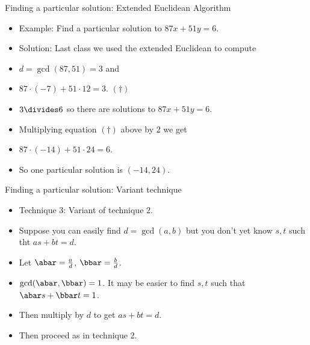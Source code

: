 \documentclass[handout]{beamer}
\begin{document}
\begin{frame}{Finding a particular solution: Extended Euclidean Algorithm}

\begin{itemize}
  \item Example: Find a particular solution to $87x + 51y = 6$.
  \item Solution: Last class we used the extended Euclidean to compute
  \item $d=\gcd(87, 51) = 3$ and
  \item $87\cdot (-7) + 51 \cdot 12 = 3$. \quad $(\dagger)$
  \item $3\divides 6$ so there are solutions to $87x + 51y = 6$.
  \item Multiplying equation $(\dagger)$ above by 2 we get
  \item $87\cdot (-14) + 51 \cdot 24 = 6$.
  \item So one particular solution is $(-14, 24)$.
\end{itemize}

\end{frame}


\begin{frame}{Finding a particular solution: Variant technique}
\begin{itemize}
  \item Technique 3: Variant of technique 2.
  \item Suppose you can easily find $d=\gcd(a,b)$ but you don't yet know $s,t$
  such tht $as + bt = d$.
  \item Let $\abar=\frac{a}{d}$, $\bbar=\frac{b}{d}$.
  \item $\gcd(\abar,\bbar)=1$. It may be easier to find $s,t$ such that $\abar s + \bbar t = 1$.
  \item Then multiply by $d$ to get $a s + b t = d$.
  \item Then proceed as in technique 2.
\end{itemize}

\end{frame}

\end{document}
